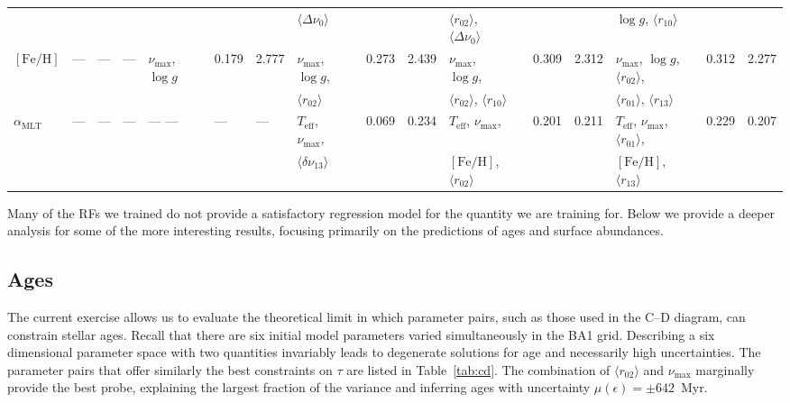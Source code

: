 {\begin{landscape}
\begin{table}
\begin{tabular}{  l | l  l  l | l  l  l  l | l  l  l  l | l  l  l  l | l  l  l  l   }
  &  &  &  &  &  &  &  &  $\langle\Delta\nu_0\rangle$ &  &  &  & $\langle r_{02}\rangle$, $\langle\Delta\nu_0\rangle$ &&  & & $\log{} g$, $\langle r_{10}\rangle$ &  &  &\\[3pt] 
  $[\text{Fe/H}]$ &--- & --- & --- & $\nu_{\max}$, $\log{} g$ && 0.179 & 2.777 & $\nu_{\max}$, $\log{} g$, && 0.273 & 2.439 & $\nu_{\max}$, $\log{} g$, && 0.309 & 2.312 & $\nu_{\max}$, $\log{} g$, $\langle r_{02}\rangle$, && 0.312 & 2.277\\
  &  &  &  &  &  &  &  &  $\langle r_{02}\rangle$ &  &  &  & $\langle r_{02}\rangle$, $\langle r_{10}\rangle$ &&  & & $\langle r_{01}\rangle$, $\langle r_{13}\rangle$ &  &  &\\[3pt] 
  $\alpha_{\text{MLT}}$ & --- & --- & --- & --- --- && --- & --- & $T_{\text{eff}}$, $\nu_{\max}$, && 0.069 & 0.234 & $T_{\text{eff}}$, $\nu_{\max}$, && 0.201 & 0.211 & $T_{\text{eff}}$, $\nu_{\max}$, $\langle r_{01}\rangle$, && 0.229 & 0.207\\
  &  &  &  &  &  &  &  &  $\langle\delta\nu_{13}\rangle$ &  &  &  & $[\text{Fe/H}]$, $\langle r_{02}\rangle$ &&  & & $[\text{Fe/H}]$, $\langle r_{13}\rangle$ &  &  &\\[3pt] 
 \end{tabular} 
 \end{table}
\end{landscape}
}

Many of the RFs we trained do not provide a satisfactory regression model for the quantity we are training for. Below we provide a deeper analysis for some of the more interesting results, focusing primarily on the predictions of ages and surface abundances. 

\subsection{Ages}
\label{sec:sages}
The current exercise allows us to evaluate the theoretical limit in which parameter pairs, such as those used in the C--D diagram, can constrain stellar ages. 
Recall that there are six initial model parameters varied simultaneously in the BA1 grid. 
Describing a six dimensional parameter space with two quantities invariably leads to degenerate solutions for age and necessarily high uncertainties.
The parameter pairs that offer similarly the best constraints on $\tau$ are listed in Table~\ref{tab:cd}. The combination of ${\langle r_{02}\rangle}$ and $\nu_{\max}$  marginally provide the best probe, explaining the largest fraction of the variance and inferring ages with uncertainty ${\mu (\epsilon) = \pm 642}$~Myr.  


